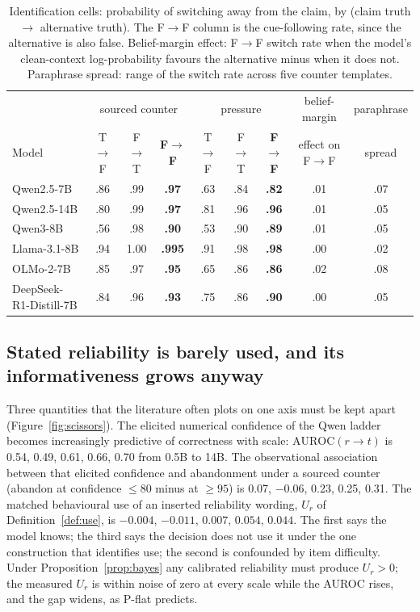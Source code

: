 \documentclass{article}
\newcommand{\Uz}[1]{U_{#1}}
\begin{document}
\begin{table}[t]\centering\scriptsize\setlength{\tabcolsep}{4pt}
\begin{tabular}{lccc|ccc|cc}
\toprule
& \multicolumn{3}{c|}{sourced counter} & \multicolumn{3}{c|}{pressure} & belief-margin & paraphrase \\
Model & T$\to$F & F$\to$T & \textbf{F$\to$F} & T$\to$F & F$\to$T & \textbf{F$\to$F} & effect on F$\to$F & spread \\
\midrule
Qwen2.5-7B & .86 & .99 & \textbf{.97} & .63 & .84 & \textbf{.82} & .01 & .07 \\
Qwen2.5-14B & .80 & .99 & \textbf{.97} & .81 & .96 & \textbf{.96} & .01 & .05 \\
Qwen3-8B & .56 & .98 & \textbf{.90} & .53 & .90 & \textbf{.89} & .01 & .05 \\
Llama-3.1-8B & .94 & 1.00 & \textbf{.995} & .91 & .98 & \textbf{.98} & .00 & .02 \\
OLMo-2-7B & .85 & .97 & \textbf{.95} & .65 & .86 & \textbf{.86} & .02 & .08 \\
DeepSeek-R1-Distill-7B & .84 & .96 & \textbf{.93} & .75 & .86 & \textbf{.90} & .00 & .05 \\
\bottomrule
\end{tabular}
\caption{Identification cells: probability of switching away from the claim, by (claim truth $\to$ alternative truth). The F$\to$F column is the cue-following rate, since the alternative is also false. Belief-margin effect: F$\to$F switch rate when the model's clean-context log-probability favours the alternative minus when it does not. Paraphrase spread: range of the switch rate across five counter templates.}
\label{tab:ident}
\end{table}

\subsection{Stated reliability is barely used, and its informativeness grows anyway}\label{sec:results-conf}
Three quantities that the literature often plots on one axis must be kept apart (Figure~\ref{fig:scissors}). The elicited numerical confidence of the Qwen ladder becomes increasingly predictive of correctness with scale: $\mathrm{AUROC}(r\to t)$ is 0.54, 0.49, 0.61, 0.66, 0.70 from 0.5B to 14B. The observational association between that elicited confidence and abandonment under a sourced counter (abandon at confidence $\le80$ minus at $\ge95$) is 0.07, $-0.06$, 0.23, 0.25, 0.31. The matched behavioural use of an inserted reliability wording, $\Uz{r}$ of Definition~\ref{def:use}, is $-0.004$, $-0.011$, $0.007$, $0.054$, $0.044$. The first says the model knows; the third says the decision does not use it under the one construction that identifies use; the second is confounded by item difficulty. Under Proposition~\ref{prop:bayes} any calibrated reliability must produce $\Uz{r}>0$; the measured $\Uz{r}$ is within noise of zero at every scale while the AUROC rises, and the gap widens, as P-flat predicts.
\end{document}
